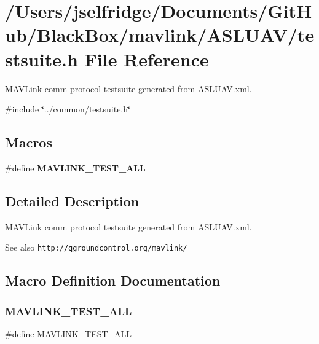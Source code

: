 \section{/\+Users/jselfridge/\+Documents/\+Git\+Hub/\+Black\+Box/mavlink/\+A\+S\+L\+U\+A\+V/testsuite.h File Reference}
\label{_a_s_l_u_a_v_2testsuite_8h}


M\+A\+V\+Link comm protocol testsuite generated from A\+S\+L\+U\+A\+V.\+xml.  


{\ttfamily \#include \char`\"{}../common/testsuite.\+h\char`\"{}}\newline
\subsection*{Macros}
\begin{DoxyCompactItemize}
\item 
\#define \textbf{ M\+A\+V\+L\+I\+N\+K\+\_\+\+T\+E\+S\+T\+\_\+\+A\+LL}
\end{DoxyCompactItemize}


\subsection{Detailed Description}
M\+A\+V\+Link comm protocol testsuite generated from A\+S\+L\+U\+A\+V.\+xml. 

\begin{DoxySeeAlso}{See also}
{\tt http\+://qgroundcontrol.\+org/mavlink/} 
\end{DoxySeeAlso}


\subsection{Macro Definition Documentation}
\mbox{\label{_a_s_l_u_a_v_2testsuite_8h_ae706a993ca59ccc1a8a7c330f0b1ceec}} 
\subsubsection{M\+A\+V\+L\+I\+N\+K\+\_\+\+T\+E\+S\+T\+\_\+\+A\+LL}
{\footnotesize\ttfamily \#define M\+A\+V\+L\+I\+N\+K\+\_\+\+T\+E\+S\+T\+\_\+\+A\+LL}

